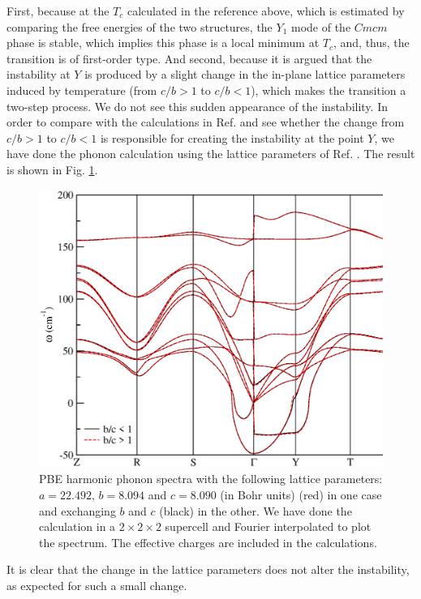 First, because at the $T_{c}$ calculated in the reference above, which is estimated by comparing the free energies 
of the two structures, the $Y_{1}$ mode of the $Cmcm$ phase is stable, which implies this phase is a local minimum 
at $T_{c}$, and, thus, the transition is of first-order type. And second, because it is argued that the instability 
at $Y$ is produced by a slight change in the in-plane lattice parameters induced by temperature (from $c/b>1$ to 
$c/b<1$), which makes the transition a two-step process. We do not see this sudden appearance of the instability. 
In order to compare with the calculations in Ref. \cite{dewandre2016two} and see whether the change from $c/b>1$ to
$c/b<1$ is responsible for creating the instability at the point $Y$, we have done the phonon calculation using the
lattice parameters of Ref. \cite{dewandre2016two}. The result is shown in Fig. \ref{exchangebc}.
\begin{figure}[th]
\begin{center}
\includegraphics[width=0.9\linewidth]{Figures/exchangebc-harmonic.eps}
\caption[Harmonic phonons of $Cmcm$ SnSe exchanging the $b$ and $c$ lattice parameters.]{PBE harmonic phonon spectra with the following lattice parameters: $a=22.492$, $b=8.094$ and $c=8.090$ (in
Bohr units) (red) in one case and exchanging $b$ and $c$ (black) in the other. We have done the calculation in a
$2\times2\times2$ supercell and Fourier interpolated to plot the spectrum. The effective charges are included in the
calculations.}
\label{exchangebc}
\end{center}
\end{figure}
It is clear that the change in the lattice parameters does not alter the instability, as expected for such a small
change. \\


